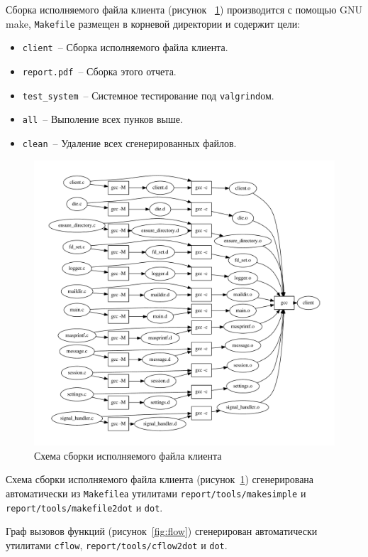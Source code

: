 \documentclass[a4paper,12pt]{report}
\begin{document}
Сборка исполняемого файла клиента (рисунок ~\ref{fig:dependencies})
производится с помощью GNU make, \texttt{Makefile} размещен в корневой
директории и содержит цели:
\begin{itemize}
\item \texttt{client}~-- Сборка исполняемого файла клиента.
\item \texttt{report.pdf}~-- Сборка этого отчета.
\item \texttt{test\_system}~-- Системное тестирование под \texttt{valgrind}ом.
\item \texttt{all}~-- Выполение всех пунков выше.
\item \texttt{clean}~-- Удаление всех сгенерированных файлов.
\end{itemize}

\begin{figure}
\centering
\includegraphics[width=\textwidth]{.tmp/report/dependencies.pdf}
\caption{Схема сборки исполняемого файла клиента}
\label{fig:dependencies}
\end{figure}

Схема сборки исполняемого файла клиента (рисунок~\ref{fig:dependencies})
сгенерирована автоматически из \texttt{Makefile}а утилитами
\texttt{report/tools/makesimple} и \texttt{report/tools/makefile2dot} и
\texttt{dot}.

Граф вызовов функций (рисунок~\ref{fig:flow}) сгенерирован автоматически
утилитами \texttt{cflow}, \texttt{report/tools/cflow2dot} и \texttt{dot}.
\end{document}
